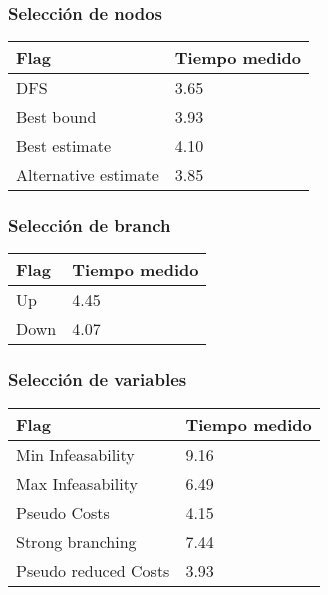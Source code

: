 \subsubsection{Selección de nodos}

    \begin{center}
        \begin{tabular}{ | m{11em} | m{5cm} | }
        \hline
        Flag & Tiempo medido \\
        \hline
        DFS & 3.65 \\
        \hline
        Best bound & 3.93 \\
        \hline
        Best estimate & 4.10 \\
        \hline
        Alternative estimate & 3.85 \\
        \hline
        \end{tabular}
    \end{center}


\subsubsection{Selección de branch}

    \begin{center}
        \begin{tabular}{ | m{7em} | m{5cm} | }
        \hline
        Flag & Tiempo medido \\
        \hline
        Up & 4.45 \\
        \hline
        Down & 4.07 \\
        \hline
        \end{tabular}
    \end{center}

\subsubsection{Selección de variables}

    \begin{center}
        \begin{tabular}{ | m{11em} | m{5cm} | }
        \hline
        Flag & Tiempo medido \\
        \hline
        Min Infeasability & 9.16 \\
        \hline
        Max Infeasability & 6.49 \\
        \hline
        Pseudo Costs & 4.15 \\
        \hline
        Strong branching & 7.44 \\
        \hline
        Pseudo reduced Costs & 3.93 \\
        \hline
        \end{tabular}
    \end{center}

